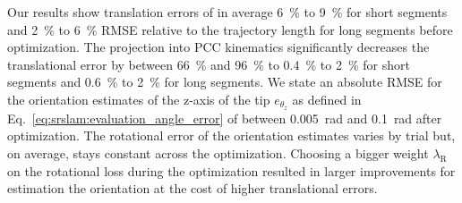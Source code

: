 Our results show translation errors of in average \SI{6}{\percent} to \SI{9}{\percent} for short segments and \SI{2}{\percent} to \SI{6}{\percent} \gls{RMSE} relative to the trajectory length for long segments before optimization. 
The projection into \gls{PCC} kinematics significantly decreases the translational error by between \SI{66}{\percent} and \SI{96}{\percent} to \SI{0.4}{\percent} to \SI{2}{\percent} for short segments and \SI{0.6}{\percent} to \SI{2}{\percent} for long segments.
%
We state an absolute \gls{RMSE} for the orientation estimates of the z-axis of the tip $e_{\theta_z}$ as defined in Eq.~\ref{eq:srslam:evaluation_angle_error} of between \SI{0.005}{\radian} and \SI{0.1}{\radian} after optimization.
The rotational error of the orientation estimates varies by trial but, on average, stays constant across the optimization. 
Choosing a bigger weight $\lambda_\mathrm{R}$ on the rotational loss during the optimization resulted in larger improvements for estimation the orientation at the cost of higher translational errors.
